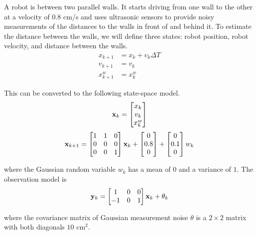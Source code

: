 A robot is between two parallel walls. It starts driving from one wall to the
other at a velocity of $0.8$ cm/s and uses ultrasonic sensors to provide noisy
measurements of the distances to the walls in front of and behind it. To
estimate the distance between the walls, we will define three \glspl{state}:
robot position, robot velocity, and distance between the walls.
\begin{align}
  x_{k+1} &= x_k + v_k \Delta T \\
  v_{k+1} &= v_k \\
  x_{k+1}^w &= x_k^w
\end{align}

This can be converted to the following state-space \gls{model}.
\begin{equation}
  \mathbf{x}_k =
  \begin{bmatrix}
    x_k \\
    v_k \\
    x_k^w
  \end{bmatrix}
\end{equation}
\begin{equation}
  \mathbf{x}_{k+1} =
  \begin{bmatrix}
    1 & 1 & 0 \\
    0 & 0 & 0 \\
    0 & 0 & 1
  \end{bmatrix} \mathbf{x}_k +
  \begin{bmatrix}
    0 \\
    0.8 \\
    0
  \end{bmatrix} +
  \begin{bmatrix}
    0 \\
    0.1 \\
    0
  \end{bmatrix} w_k
\end{equation}

where the Gaussian random variable $w_k$ has a mean of $0$ and a variance of
$1$. The observation \gls{model} is
\begin{equation}
  \mathbf{y}_k =
  \begin{bmatrix}
    1 & 0 & 0 \\
    -1 & 0 & 1
  \end{bmatrix} \mathbf{x}_k + \theta_k
\end{equation}

where the covariance matrix of Gaussian measurement noise $\theta$ is a
$2 \times 2$ matrix with both diagonals $10$ cm$^2$.

